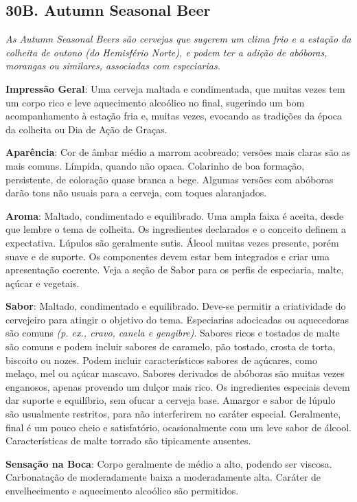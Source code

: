 \subsection*{30B. Autumn Seasonal Beer}
\textit{As Autumn Seasonal Beers são cervejas que sugerem um clima frio e a estação da colheita de outono (do Hemisfério Norte), e podem ter a adição de abóboras, morangas ou similares, associadas com especiarias.}

\textbf{Impressão Geral}: Uma cerveja maltada e condimentada, que muitas vezes tem um corpo rico e leve aquecimento alcoólico no final, sugerindo um bom acompanhamento à estação fria e, muitas vezes, evocando as tradições da época da colheita ou Dia de Ação de Graças.

\textbf{Aparência}: Cor de âmbar médio a marrom acobreado; versões mais claras são as mais comuns. Límpida, quando não opaca. Colarinho de boa formação, persistente, de coloração quase branca a bege. Algumas versões com abóboras darão tons não usuais para a cerveja, com toques alaranjados.

\textbf{Aroma}: Maltado, condimentado e equilibrado. Uma ampla faixa é aceita, desde que lembre o tema de colheita. Os ingredientes declarados e o conceito definem a expectativa. Lúpulos são geralmente sutis. Álcool muitas vezes presente, porém suave e de suporte. Os componentes devem estar bem integrados e criar uma apresentação coerente. Veja a seção de Sabor para os perfis de especiaria, malte, açúcar e vegetais.

\textbf{Sabor}: Maltado, condimentado e equilibrado. Deve-se permitir a criatividade do cervejeiro para atingir o objetivo do tema. Especiarias adocicadas ou aquecedoras são comuns \textit{(p. ex., cravo, canela e gengibre)}. Sabores ricos e tostados de malte são comuns e podem incluir sabores de caramelo, pão tostado, crosta de torta, biscoito ou nozes. Podem incluir característicos sabores de açúcares, como melaço, mel ou açúcar mascavo. Sabores derivados de abóboras são muitas vezes enganosos, apenas provendo um dulçor mais rico. Os ingredientes especiais devem dar suporte e equilíbrio, sem ofucar a cerveja base. Amargor e sabor de lúpulo são usualmente restritos, para não interferirem no caráter especial. Geralmente, final é um pouco cheio e satisfatório, ocasionalmente com um leve sabor de álcool. Características de malte torrado são tipicamente ausentes.

\textbf{Sensação na Boca}: Corpo geralmente de médio a alto, podendo ser viscosa. Carbonatação de moderadamente baixa a moderadamente alta. Caráter de envelhecimento e aquecimento alcoólico são permitidos.


